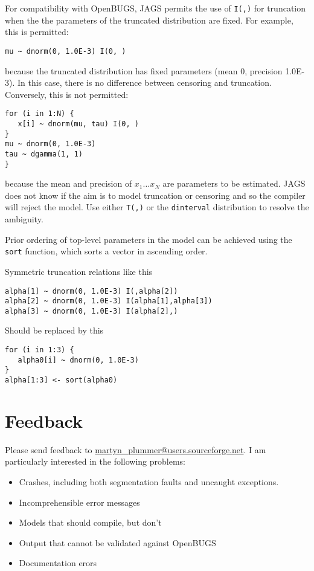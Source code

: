 \documentclass[11pt, a4paper, titlepage]{report}
\newcommand{\OpenBUGS}{\textsf{OpenBUGS}}
\begin{document}
For compatibility with OpenBUGS, JAGS permits the use of \texttt{I(,)}
for truncation when the the parameters of the truncated distribution
are fixed.  For example, this is permitted:
\begin{verbatim}
mu ~ dnorm(0, 1.0E-3) I(0, )
\end{verbatim}
because the truncated distribution has fixed parameters (mean 0,
precision 1.0E-3).  In this case, there is no difference between 
censoring and truncation.  Conversely, this is not permitted:
\begin{verbatim}
for (i in 1:N) {
   x[i] ~ dnorm(mu, tau) I(0, )
}
mu ~ dnorm(0, 1.0E-3)
tau ~ dgamma(1, 1)
}
\end{verbatim}
because the mean and precision of $x_1 \dots x_N$ are parameters to be
estimated.  JAGS does not know if the aim is to model truncation or censoring
and so the compiler will reject the model. Use either \texttt{T(,)} or the
\texttt{dinterval} distribution to resolve the ambiguity.

Prior ordering of top-level parameters in the model can be achieved
using the \texttt{sort} function, which sorts a vector in ascending
order.

Symmetric truncation relations like this
\begin{verbatim}
alpha[1] ~ dnorm(0, 1.0E-3) I(,alpha[2])
alpha[2] ~ dnorm(0, 1.0E-3) I(alpha[1],alpha[3])
alpha[3] ~ dnorm(0, 1.0E-3) I(alpha[2],)
\end{verbatim}
Should be replaced by this
\begin{verbatim}
for (i in 1:3) {
   alpha0[i] ~ dnorm(0, 1.0E-3)
}
alpha[1:3] <- sort(alpha0)
\end{verbatim}

\chapter{Feedback}

Please send feedback to \url{martyn_plummer@users.sourceforge.net}.
I am particularly interested in the following problems:

\begin{itemize}
\item Crashes, including both segmentation faults and uncaught exceptions.
\item Incomprehensible error messages
\item Models that should compile, but don't 
\item Output that cannot be validated against \OpenBUGS
\item Documentation erors
\end{itemize}
\end{document}
